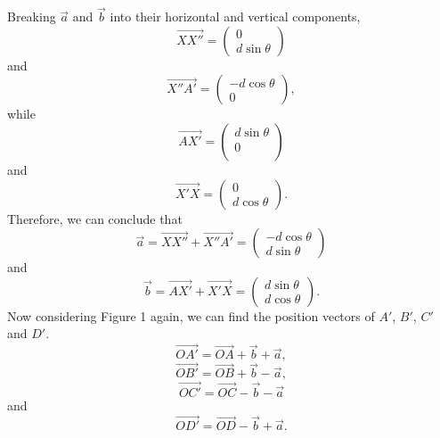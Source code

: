 \documentclass{article}
\begin{document}
Breaking $\vec{a}$ and $\vec{b}$ into their horizontal and vertical components, 
$$\overrightarrow{XX''} = 
\begin{pmatrix}
	0\\
	d\sin{\theta}
\end{pmatrix}$$
and
$$\overrightarrow{X''A'} =
\begin{pmatrix}
	-d\cos{\theta}\\
	0
\end{pmatrix},$$ 
while 
$$\overrightarrow{AX'} = 
\begin{pmatrix}
	d\sin{\theta}\\
	0\\
\end{pmatrix}$$
and 
$$\overrightarrow{X'X} = 
\begin{pmatrix}
	0\\
	d\cos{\theta}
\end{pmatrix}.$$
Therefore, we can conclude that $$\vec{a} = \overrightarrow{XX''} + \overrightarrow{X''A'}= 
\begin{pmatrix}
	-d\cos{\theta}\\
	d\sin{\theta}
\end{pmatrix}$$
and 
$$\vec{b} = \overrightarrow{AX'} + \overrightarrow{X'X} = 
\begin{pmatrix}
	d\sin{\theta}\\
	d\cos{\theta}
\end{pmatrix}.$$
Now considering Figure 1 again, we can find the position vectors of $A'$, $B'$, $C'$ and $D'$. $$\overrightarrow{OA'} = \overrightarrow{OA} + \vec{b} + \vec{a},$$ $$\overrightarrow{OB'} = \overrightarrow{OB} + \vec{b} - \vec{a},$$ $$\overrightarrow{OC'} = \overrightarrow{OC} -\vec{b} - \vec{a}$$ and $$\overrightarrow{OD'} = \overrightarrow{OD} - \vec{b} + \vec{a}.$$
\end{document}
